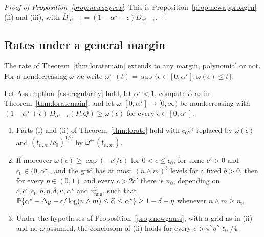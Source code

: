 \begin{proof}[Proof of Proposition~\ref{prop:newapprox}]
This is Proposition~\ref{prop:newapproxgen}(ii) and (iii), with $\bar D_{\alpha^\star-\epsilon}=(1-\alpha^\star+\epsilon)D_{\alpha^\star-\epsilon}$.
\end{proof}

\subsection{Rates under a general margin}

The rate of Theorem~\ref{thm:loratemain} extends to any margin, polynomial or not. For a nondecreasing $\omega$ we
write $\omega^{\leftarrow}(t)=\sup\{\epsilon\in[0,\alpha^\star]:\omega(\epsilon)\le t\}$.

\begin{proposition}
\label{prop:newrates}
Let Assumption~\ref{ass:regularity} hold, let $\alpha^\star<1$, compute $\widehat\alpha$ as in
Theorem~\ref{thm:loratemain}, and let $\omega:[0,\alpha^\star]\to[0,\infty)$ be nondecreasing with
$(1-\alpha^\star+\epsilon)\,D_{\alpha^\star-\epsilon}(P,Q)\ge\omega(\epsilon)$ for every $\epsilon\in[0,\alpha^\star]$.
\begin{enumerate}[label=(\roman*),leftmargin=*]
\item Parts (i) and (ii) of Theorem~\ref{thm:lorate} hold with $c_0\epsilon^\gamma$ replaced by
$\omega(\epsilon)$ and $(t_{n,m}/c_0)^{1/\gamma}$ by $\omega^{\leftarrow}(t_{n,m})$.
\item If moreover $\omega(\epsilon)\ge\exp(-c'/\epsilon)$ for $0<\epsilon\le\epsilon_0$, for some $c'>0$ and
$\epsilon_0\in(0,\alpha^\star]$, and the grid has at most $(n\wedge m)^b$ levels for a fixed $b>0$, then for every
$\eta\in(0,1)$ and every $c>2c'$ there is $n_0$, depending on $c,c',\epsilon_0,b,\eta,\delta,\kappa,\alpha^\star$ and
$v^2_{\min}$, such that
$\mathbb{P}\{\alpha^\star-\Delta_{\mathcal G}-c/\log(n\wedge m)\le\widehat\alpha\le\alpha^\star\}\ge1-\delta-\eta$
whenever $n\wedge m\ge n_0$.
\item Under the hypotheses of Proposition~\ref{prop:newgauss}, with a grid as in (ii) and no $\omega$ assumed, the
conclusion of (ii) holds for every $c>\pi^2\sigma^2\ell_0/4$.
\end{enumerate}
\end{proposition}

